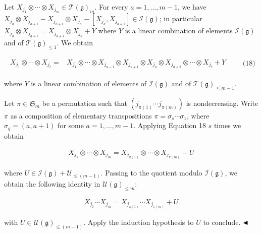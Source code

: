 Let $X_{j_{1}}\otimes\cdots\otimes X_{j_{m}}\in\mathcal{T}(\mathfrak{g})_{m}$. For every $a=1,\ldots,m-1$, we have $X_{j_{a}}\otimes X_{j_{a+1}}-X_{j_{a+1}}\otimes X_{j_{a}}-[X_{j_{a}},X_{j_{a+1}}]\in\mathcal{I}(\mathfrak{g})$; in particular $X_{j_{a}}\otimes X_{j_{a+1}}=X_{j_{a+1}}\otimes X_{j_{a}}+Y$ where $Y$ is a linear combination of elements $\mathcal{I}(\mathfrak{g})$ and of $\mathcal{T}(\mathfrak{g})_{\leq 1}$. We obtain



\[\begin{aligned}
\begin{split}X_{j_{1}}\otimes\cdots\otimes X_{j_{\ell}}=&X_{j_{1}}\otimes\cdots\otimes X_{j_{a-1}}\otimes X_{j_{a+1}}\otimes X_{j_{a}}\otimes X_{j_{a+2}}\otimes\cdots\otimes X_{j_{\ell}}+Y\end{split}\qquad\text{(18)}
\end{aligned}\]


where $Y$ is a linear combination of elements of $\mathcal{I}(\mathfrak{g})$ and of $\mathcal{T}(\mathfrak{g})_{\leq m-1}$.





Let $\pi\in\mathfrak{S}_{m}$ be a permutation such that $(j_{\pi(1)}\cdots j_{\pi(m)})$ is nondecreasing. Write $\pi$ as a composition of elementary transpositions $\pi=\sigma_{s}\cdots\sigma_{1}$, where $\sigma_{q}=(a,a+1)$ for some $a=1,\ldots,m-1$. Applying Equation 18 $s$ times we obtain



\[\begin{aligned}
X_{j_{1}}\otimes\cdots\otimes X_{j_{m}}=X_{j_{\pi(1)}}\otimes\cdots\otimes X_{j_{\pi(m)}}+U
\end{aligned}\]


where $U\in\mathcal{I}(\mathfrak{g})+\mathcal{U}_{\leq(m-1)}$. Passing to the quotient modulo $\mathcal{I}(\mathfrak{g})$, we obtain the following identity in $\mathcal{U}(\mathfrak{g})_{\leq m}$:



\[\begin{aligned}
X_{j_{1}}\cdots X_{j_{m}}=X_{j_{\pi(1)}}\cdots X_{j_{\pi(m)}}+U
\end{aligned}\]


with $U\in\mathcal{U}(\mathfrak{g})_{\leq(m-1)}$. Apply the induction hypothesis to $U$ to conclude.
$\hfill\blacktriangleleft$




